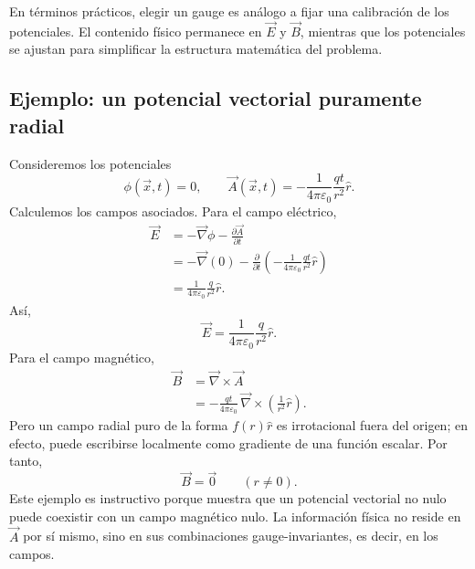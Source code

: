 \documentclass[12pt,a4paper]{article}
\theoremstyle{definition}
\theoremstyle{plain}
\numberwithin{equation}{section}
\theoremstyle{remark}
\newcommand{\E}{\vec{E}}
\newcommand{\B}{\vec{B}}
\begin{document}
En términos prácticos, elegir un gauge es análogo a fijar una calibración de los potenciales. El contenido físico permanece en $\E$ y $\B$, mientras que los potenciales se ajustan para simplificar la estructura matemática del problema.

\subsection*{Ejemplo: un potencial vectorial puramente radial}
Consideremos los potenciales
\begin{equation*}
    \phi(\vec x,t)=0,
    \qquad
    \vec A(\vec x,t)= -\frac{1}{4\pi\varepsilon_0}\frac{qt}{r^2}\hat r.
\end{equation*}
Calculemos los campos asociados. Para el campo eléctrico,
\begin{align*}
    \E &= -\vec\nabla\phi - \frac{\partial \vec A}{\partial t} \\
    &= -\vec\nabla(0) - \frac{\partial}{\partial t}\left(-\frac{1}{4\pi\varepsilon_0}\frac{qt}{r^2}\hat r\right) \\
    &= \frac{1}{4\pi\varepsilon_0}\frac{q}{r^2}\hat r.
\end{align*}
Así,
\begin{equation*}
    \E = \frac{1}{4\pi\varepsilon_0}\frac{q}{r^2}\hat r.
\end{equation*}
Para el campo magnético,
\begin{align*}
    \B &= \vec\nabla\times\vec A \\
    &= -\frac{qt}{4\pi\varepsilon_0}\,\vec\nabla\times\left(\frac{1}{r^2}\hat r\right).
\end{align*}
Pero un campo radial puro de la forma $f(r)\hat r$ es irrotacional fuera del origen; en efecto, puede escribirse localmente como gradiente de una función escalar. Por tanto,
\begin{equation*}
    \B = \vec 0
    \qquad (r\neq 0).
\end{equation*}
Este ejemplo es instructivo porque muestra que un potencial vectorial no nulo puede coexistir con un campo magnético nulo. La información física no reside en $\vec A$ por sí mismo, sino en sus combinaciones gauge-invariantes, es decir, en los campos.
\end{document}
